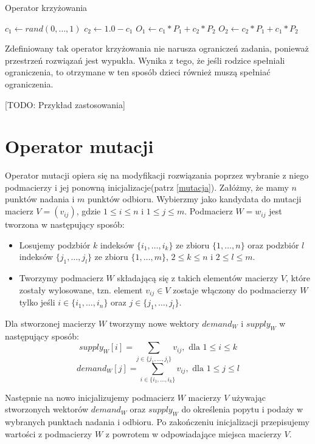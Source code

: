 \begin{pseudokod}[H]
    \label{krzyżowanie}
    \caption{Operator krzyżowania}
    \BlankLine
    $c_1 \gets rand(0,\dots,1)$
    $c_2 \gets 1.0 - c_1$\;
    $O_1 \gets c_1 * P_1 + c_2 * P_2$\;
    $O_2 \gets c_2 * P_1 + c_1 * P_2$\;
    \;
\end{pseudokod}

Zdefiniowany tak operator krzyżowania nie narusza ograniczeń zadania, ponieważ przestrzeń rozwiązań jest wypukła. Wynika z tego, że jeśli 
rodzice spełniali ograniczenia, to otrzymane w ten sposób dzieci również muszą spełniać ograniczenia.

[TODO: Przykład zastosowania]

\section{Operator mutacji}
Operator mutacji opiera się na modyfikacji rozwiązania poprzez wybranie z niego podmacierzy i jej ponowną inicjalizacje(patrz \ref{mutacja}). 
Załóżmy, że mamy $n$ punktów nadania i $m$ punktów odbioru. Wybierzmy jako kandydata do mutacji macierz $V = (v_{ij})$, gdzie $1 \le i \le n$ i 
$1 \le j \le m$. Podmacierz $W = w_{ij}$ jest tworzona w następujący sposób:

\begin{itemize}
    \item Losujemy podzbiór $k$ indeksów $\{i_1, \dots, i_k\}$ ze zbioru $\{1, \dots, n\}$ oraz podzbiór $l$ indeksów $\{j_1, \dots, j_l\}$ 
    ze zbioru $\{1, \dots, m\}$, $2 \le k \le n$ i $2 \le l \le m$.
    \item Tworzymy podmacierz $W$ składającą się z takich elementów macierzy $V$, które zostały wylosowane, tzn. element $v_{ij} \in V$ 
    zostaje włączony do podmacierzy $W$ tylko jeśli $i \in \{i_1, \dots, i_n\}$ oraz $j \in \{j_1, \dots, j_l\}$.
\end{itemize}

Dla stworzonej macierzy $W$ tworzymy nowe wektory $demand_W$ i $supply_W$ w następujący sposób:
$$supply_W[i] = \sum_{j \in \{j_1, \dots, j_l\}} v_{ij}, \text{ dla } 1 \le i \le k$$
$$demand_W[j] = \sum_{i \in \{i_1, \dots, i_k\}} v_{ij}, \text{ dla } 1 \le j \le l$$

Następnie na nowo inicjalizujemy podmacierz $W$ macierzy $V$ używając stworzonych wektorów $demand_W$ oraz $supply_W$ do określenia popytu i podaży 
w wybranych punktach nadania i odbioru. Po zakończeniu inicjalizacji przepisujemy wartości z podmacierzy $W$ z powrotem w odpowiadające miejsca 
macierzy $V$.

